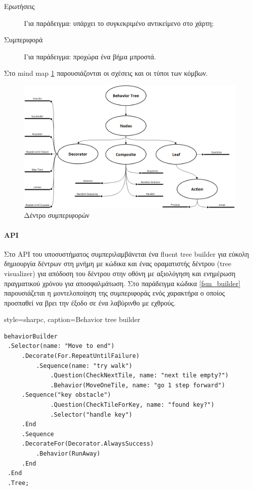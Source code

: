 \begin{description}
	\item [Ερωτήσεις] Για παράδειγμα: υπάρχει το συγκεκριμένο αντικείμενο στο χάρτη;
	\item [Συμπεριφορά] Για παράδειγμα: προχώρα ένα βήμα μπροστά.
\end{description}

Στο mind map \ref{fig:behavior_trees_mind_map} παρουσιάζονται οι σχέσεις και οι τύποι των κόμβων.
\begin{figure}[h!]
	\centering
	\includegraphics[width=165mm]{Images/behavior_trees}
	\caption{Δέντρο συμπεριφορών}
	\label{fig:behavior_trees_mind_map}
\end{figure}
	
\paragraph{API}
Στο \gls{API} του υποσυστήματος συμπεριλαμβάνεται ένα fluent tree builder για εύκολη δημιουργία δέντρων στη μνήμη με κώδικα και ένας οραματιστής δέντρου (tree visualizer) για απόδοση του δέντρου στην οθόνη με αξιολόγηση και ενημέρωση πραγματικού χρόνου για αποσφαλμάτωση. Στο παράδειγμα κώδικα \ref{fsm_builder} παρουσιάζεται η μοντελοποίηση της συμπεριφοράς ενός χαρακτήρα ο οποίος προσπαθεί να βρει την έξοδο σε ένα λαβύρινθο με εχθρούς.

	\lstset
	{
		style=sharpc, 
		caption={Behavior tree builder}		
	}
	\begin{lstlisting}[label=fsm_builder]
 behaviorBuilder
 .Selector(name: "Move to end")
	 .Decorate(For.RepeatUntilFailure)
		 .Sequence(name: "try walk")
			 .Question(CheckNextTile, name: "next tile empty?")
			 .Behavior(MoveOneTile, name: "go 1 step forward")
	 .Sequence("key obstacle")
			 .Question(CheckTileForKey, name: "found key?")
			 .Selector("handle key")
	 .End
	 .Sequence
	 .DecorateFor(Decorator.AlwaysSuccess)
		 .Behavior(RunAway)
	 .End
 .End
 .Tree;
	\end{lstlisting}


